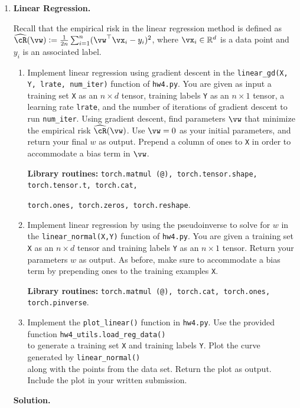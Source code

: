 \documentclass{article}
\def\R{\mathbb{R}}
\def\hcR{\widehat{\cR}}
\theoremstyle{definition}
\theoremstyle{remark}
\newenvironment{Q}
{%
  \clearpage
  \item
  }
  {%
    \phantom{s} %
    \bigskip
    \textbf{Solution.}
  }
\begin{document}
\begin{enumerate}[font={\Large\bfseries},left=0pt]
    \begin{Q}
      \textbf{\Large Linear Regression.}

      Recall that the empirical risk in the linear regression method is defined as $\hcR(\vw) := \frac{1}{2n}\sum_{i=1}^n (\vw^\top \vx_i - y_i)^2$, where $\vx_i \in \R^d$ is a data point and $y_i$ is an associated label.
      \begin{enumerate}
        \item Implement linear regression using gradient descent in the \texttt{linear\_gd(X, Y, lrate, num\_iter)} function of \texttt{hw4.py}. You are given as input a training set \texttt{X} as an $n \times d$ tensor, training labels \texttt{Y} as an $n \times 1$ tensor, a learning rate \texttt{lrate}, and the number of iterations of gradient descent to run \texttt{num\_iter}.  Using gradient descent, find parameters $\vw$ that minimize the empirical risk $\hcR(\vw)$. Use $\vw = 0$ as your initial parameters, and return your final $w$ as output. Prepend a column of ones to \texttt{X} in order to accommodate a bias term in $\vw$.

          \textbf{Library routines:} \texttt{torch.matmul (@), torch.tensor.shape, torch.tensor.t, torch.cat,} 

          \texttt{torch.ones, torch.zeros, torch.reshape}.

        \item Implement linear regression by using the pseudoinverse to solve for $w$ in the \texttt{linear\_normal(X,Y)} function of \texttt{hw4.py}. 
        You are given a training set \texttt{X} as an $n \times d$ tensor and training labels \texttt{Y} as an $n \times 1$ tensor. Return your parameters 
        $w$ as output. As before, make sure to accommodate a bias term by prepending ones to the training examples \texttt{X}.

          \textbf{Library routines:} \texttt{torch.matmul (@), torch.cat, torch.ones, torch.pinverse}.

        \item Implement the \texttt{plot\_linear()} function in \texttt{hw4.py}.  Use the provided function \texttt{hw4\_utils.load\_reg\_data()}\\ 
        to generate a training set \texttt{X} and training labels \texttt{Y}. Plot the curve generated by \texttt{linear\_normal()}\\ along with the 
        points from the data set.  Return the plot as output.  Include the plot in your written submission.


\end{enumerate}
\end{Q}
\end{enumerate}
\end{document}
